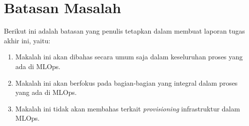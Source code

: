 \section{Batasan Masalah}

Berikut ini adalah batasan yang penulis tetapkan dalam membuat laporan tugas akhir ini, yaitu:

\begin{enumerate}
  \item Makalah ini akan dibahas secara umum saja dalam keseluruhan proses yang ada di MLOps.
  \item Makalah ini akan berfokus pada bagian-bagian yang integral dalam proses yang ada di MLOps.
  \item Makalah ini tidak akan membahas terkait \textit{provisioning} infrastruktur dalam MLOps. 
\end{enumerate}